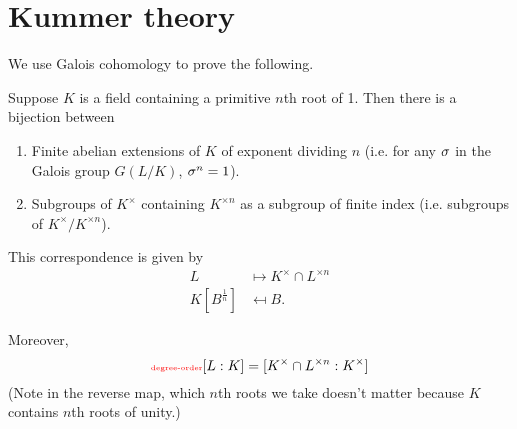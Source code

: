 \section{Kummer theory}
We use Galois cohomology to prove the following.
\begin{thm}
Suppose $K$ is a field containing a primitive $n$th root of 1. Then there is a bijection between
\begin{enumerate}
\item Finite abelian extensions of $K$ of exponent dividing $n$ (i.e. for any $\sigma$ in the Galois group $G(L/K)$, $\sigma^n=1$).
\item Subgroups of $K^{\times}$ containing $K^{\times n}$ as a subgroup of finite index (i.e. subgroups of $K^{\times}/K^{\times n}$).
\end{enumerate}
This correspondence is given by
\begin{align*}
L&\mapsto K^{\times }\cap L^{\times n}\\
K[B^{\frac{1}{n}}]&\mapsfrom B.\end{align*}
\end{thm}
Moreover,
\begin{equation}
\llabel{degree-order}
[L:K]=[K^{\times}\cap L^{\times n}:K^{\times}]
\end{equation}
(Note in the reverse map, which $n$th roots we take doesn't matter because $K$ contains $n$th roots of unity.)

